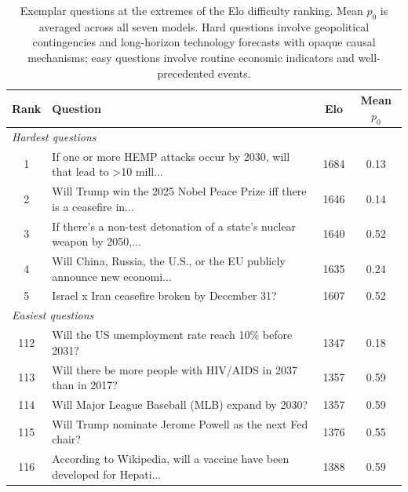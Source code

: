 \begin{table}[t]
\centering
\small
\begin{tabular}{clcc}
\toprule
\textbf{Rank} & \textbf{Question} & \textbf{Elo} & \textbf{Mean $p_0$} \\
\midrule
\multicolumn{4}{l}{\textit{Hardest questions}} \\
1 & If one or more HEMP attacks occur by 2030, will that lead to >10 mill... & 1684 & 0.13 \\
2 & Will Trump win the 2025 Nobel Peace Prize iff there is a ceasefire in... & 1646 & 0.14 \\
3 & If there's a non-test detonation of a state's nuclear weapon by 2050,... & 1640 & 0.52 \\
4 & Will China, Russia, the U.S., or the EU publicly announce new economi... & 1635 & 0.24 \\
5 & Israel x Iran ceasefire broken by December 31? & 1607 & 0.52 \\
\midrule
\multicolumn{4}{l}{\textit{Easiest questions}} \\
112 & Will the US unemployment rate reach 10\% before 2031? & 1347 & 0.18 \\
113 & Will there be more people with HIV/AIDS in 2037 than in 2017? & 1357 & 0.59 \\
114 & Will Major League Baseball (MLB) expand by 2030? & 1357 & 0.59 \\
115 & Will Trump nominate Jerome Powell as the next Fed chair? & 1376 & 0.55 \\
116 & According to Wikipedia, will a vaccine have been developed for Hepati... & 1388 & 0.59 \\
\bottomrule
\end{tabular}
\caption{Exemplar questions at the extremes of the Elo difficulty ranking. Mean $p_0$ is averaged across all seven models. Hard questions involve geopolitical contingencies and long-horizon technology forecasts with opaque causal mechanisms; easy questions involve routine economic indicators and well-precedented events.}
\label{tab:elo_exemplars}
\end{table}